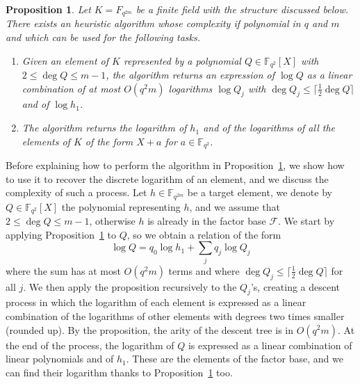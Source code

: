 \documentclass[a4paper,11pt]{article}
\theoremstyle{break}
\newtheorem{prop}[thm]{Proposition}
\theoremstyle{sc}
\theoremstyle{definition}
\theoremstyle{remark}
\begin{document}
\begin{prop}
  \label{prop-bgjt}
  Let $K = F_{q^{2m}}$ be a finite field with the structure discussed below.
  There exists an heuristic algorithm whose complexity if polynomial in $q$ and
  $m$ and which can be used for the following tasks.

  \begin{enumerate}
    \item Given an element of $K$ represented by a polynomial
      $Q\in\mathbb{F}_{q^2}[X]$ with $2\leq \deg Q \leq m-1$, the algorithm
      returns an expression of $\log Q$ as a linear combination of at most
      $O(q^2m)$ logarithms $\log Q_j$ with $\deg Q_j\leq
      \lceil\frac{1}{2}\deg Q\rceil$ and of $\log h_1$.
    \item The algorithm returns the logarithm of $h_1$ and of the logarithms of
      all the elements of $K$ of the form $X+a$ for $a\in\mathbb{F}_{q^2}$.
  \end{enumerate}
\end{prop}

Before explaining how to perform the algorithm in Proposition~\ref{prop-bgjt},
we show how to use it to recover the discrete logarithm of an element, and we
discuss the complexity of such a process. Let $h\in\mathbb{F}_{q^{2m}}$ be a
target element, we denote by $Q\in\mathbb{F}_{q^2}[X]$ the polynomial
representing $h$, and we assume that $2\leq \deg Q\leq m-1$, otherwise $h$ is
already in the factor base $\mathcal F$. We start by applying
Proposition~\ref{prop-bgjt} to $Q$, so we obtain a relation of the form
\[
  \log Q = q_0\log h_1 + \sum_j q_j\log Q_j
\]
where the sum has at most $O(q^2m)$ terms and where $\deg
Q_j\leq\lceil\frac{1}{2}\deg Q\rceil$ for all $j$. We then apply the proposition
recursively to the $Q_j$'s, creating a descent process in which the logarithm of
each element is expressed as a linear combination of the logarithms of other
elements with degrees two times smaller (rounded up). By the proposition, the
arity of the descent tree is in $O(q^2m)$. At the end of the process, the
logarithm of $Q$ is expressed as a linear combination of linear polynomials and
of $h_1$. These are the elements of the factor base, and we can find their
logarithm thanks to Proposition~\ref{prop-bgjt} too.
\end{document}
